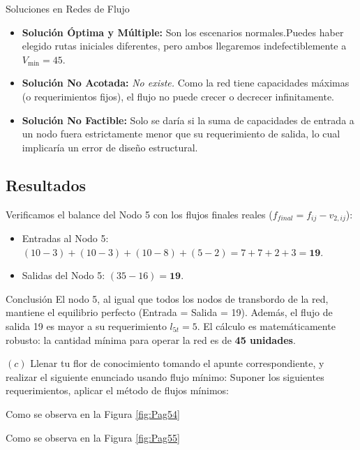 \documentclass[10pt,a4paper]{article}
\begin{document}
\begin{nota}{Soluciones en Redes de Flujo}
\begin{itemize}
    \item \textbf{Solución Óptima y Múltiple:} Son los escenarios normales.Puedes haber elegido rutas iniciales diferentes, pero ambos llegaremos indefectiblemente a $V_{\min} = 45$.
    \item \textbf{Solución No Acotada:} \textit{No existe.} Como la red tiene capacidades máximas (o requerimientos fijos), el flujo no puede crecer o decrecer infinitamente.
    \item \textbf{Solución No Factible:} Solo se daría si la suma de capacidades de entrada a un nodo fuera estrictamente menor que su requerimiento de salida, lo cual implicaría un error de diseño estructural.
\end{itemize}
\end{nota}

\subsection{Resultados}

Verificamos el balance del Nodo 5 con los flujos finales reales ($f_{final} = f_{ij} - v_{2,ij}$):
\begin{itemize}
    \item Entradas al Nodo 5: $(10-3) + (10-3) + (10-8) + (5-2) = 7 + 7 + 2 + 3 = \mathbf{19}$.
    \item Salidas del Nodo 5: $(35-16) = \mathbf{19}$.
\end{itemize}

\begin{alerta}{Conclusión}
El nodo 5, al igual que todos los nodos de transbordo de la red, mantiene el equilibrio perfecto (Entrada = Salida = 19). Además, el flujo de salida 19 es mayor a su requerimiento $l_{5t} = 5$. El cálculo es matemáticamente robusto: la cantidad mínima para operar la red es de \textbf{45 unidades}.
\end{alerta}



$(c)$ Llenar tu flor de conocimiento tomando el apunte correspondiente, y realizar el
siguiente enunciado usando flujo mínimo:
Suponer los siguientes requerimientos, aplicar el método de flujos mínimos: 

Como se observa en la Figura \autoref{fig:Pag54} 

Como se observa en la Figura \autoref{fig:Pag55}
\end{document}

